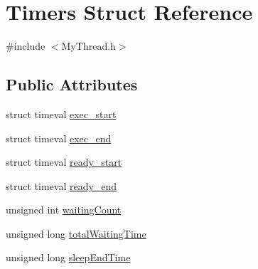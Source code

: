 \hypertarget{structTimers}{\section{Timers Struct Reference}
\label{structTimers}
}


{\ttfamily \#include $<$My\-Thread.\-h$>$}

\subsection*{Public Attributes}
\begin{DoxyCompactItemize}
\item 
struct timeval \hyperlink{structTimers_ab20639ab87d42a43d5ab679070ae6625}{exec\-\_\-start}
\item 
struct timeval \hyperlink{structTimers_abafe60fb86d74d40dfdc90a423743e08}{exec\-\_\-end}
\item 
struct timeval \hyperlink{structTimers_a3f10bbafe694876f448cd427ccd6724b}{ready\-\_\-start}
\item 
struct timeval \hyperlink{structTimers_a0987d235d4c34273d27c350888bd1173}{ready\-\_\-end}
\item 
unsigned int \hyperlink{structTimers_aec81485f4bce2b24c05d0063371300db}{waiting\-Count}
\item 
unsigned long \hyperlink{structTimers_a724d8fad61b1491b1cf5786f244f28af}{total\-Waiting\-Time}
\item 
unsigned long \hyperlink{structTimers_ad9992f03cf5ba592d57291a9624ad5e7}{sleep\-End\-Time}
\end{DoxyCompactItemize}


